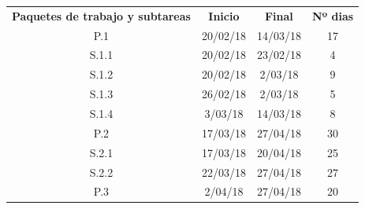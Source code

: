 \begin{table}[H]
\centering
\begin{tabular}{cccc}
\rowcolor[HTML]{3531FF} 
{\color[HTML]{FFFFFF} \textbf{Paquetes de trabajo y subtareas}} & {\color[HTML]{FFFFFF} \textbf{Inicio}}   & {\color[HTML]{FFFFFF} \textbf{Final}}   & {\color[HTML]{FFFFFF} \textbf{Nº dias}} \\
\rowcolor[HTML]{FD6864} 
P.1                                                             & 20/02/18                                 & 14/03/18                                & 17                                      \\
\rowcolor[HTML]{FFCCC9} 
S.1.1                                                           & 20/02/18                                 & 23/02/18                                & 4                                       \\
\rowcolor[HTML]{FFCCC9} 
S.1.2                                                           & 20/02/18                                 & 2/03/18                                 & 9                                       \\
\rowcolor[HTML]{FFCCC9} 
S.1.3                                                           & 26/02/18                                 & 2/03/18                                 & 5                                       \\
\rowcolor[HTML]{FFCCC9} 
S.1.4                                                           & 3/03/18                                  & 14/03/18                                & 8                                       \\
\rowcolor[HTML]{FE996B} 
P.2                                                             & 17/03/18                                 & 27/04/18                                & 30                                      \\
\rowcolor[HTML]{FFCE93} 
S.2.1                                                           & 17/03/18                                 & 20/04/18                                & 25                                      \\
\rowcolor[HTML]{FFCE93} 
S.2.2                                                           & 22/03/18                                 & 27/04/18                                & 27                                      \\
\rowcolor[HTML]{FFFE65} 
P.3                                                             & 2/04/18                                  & 27/04/18                                & 20                                      \\

\end{tabular}
\end{table}
